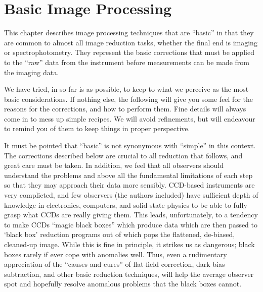 %
%
%
%
%
%
%
%
%
%
%
%
%
%

\chapter{Basic Image Processing}

This chapter describes image processing techniques that are ``basic'' in that
they are common to almost all image reduction tasks, whether the final end is
imaging or spectrophotometry.  They represent the basic corrections that must
be applied to the ``raw'' data from the instrument before measurements can be
made from the imaging data. 

We have tried, in so far is as possible, to keep to what we perceive as the
most basic considerations.  
If nothing
else, the following will give you some feel for the reasons for the
corrections, and how to perform them.  Fine details will always come in to
mess up simple recipes.  We will avoid refinements, but will endeavour to
remind you of them to keep things in proper perspective. 

It must be pointed that ``basic'' is not synonymous with ``simple'' in this
context.  The corrections described below are crucial to all reduction that
follows, and great care must be taken.  In addition, we feel that all
observers should understand the problems and above all the fundamental
limitations of each step so that they may approach their data more sensibly.
CCD-based instruments are very complicted, and few observers (the authors
included) have sufficient depth of knowledge in electronics, computers, and
solid-state physics to be able to fully grasp what CCDs are really giving
them. This leads, unfortunately, to a tendency to make CCDs ``magic black
boxes'' which produce data which are then passed to `black box' reduction
programs out of which pops the flattened, de-biased, cleaned-up image.  While
this is fine in principle, it strikes us as dangerous; black boxes rarely if
ever cope with anomalies well.  Thus, even a rudimentary appreciation of the
``causes and cures'' of flat-field correction, dark bias subtraction, and
other basic reduction techniques, will help the average observer spot and
hopefully resolve anomalous problems that the black boxes cannot. 

